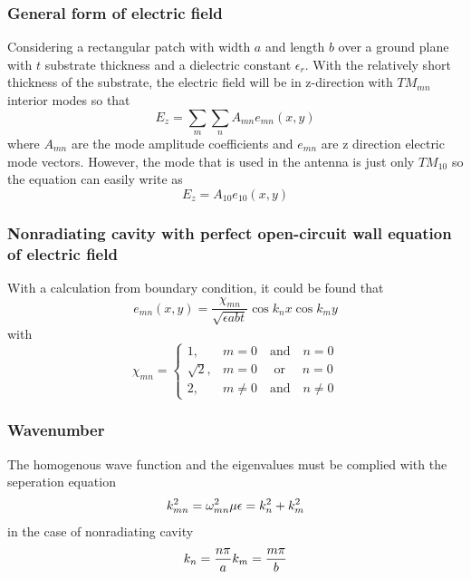 \documentclass[11pt,a4paper]{article}
\begin{document}
      \subsubsection{General form of electric field}
        \indent Considering a rectangular patch with width $a$ and length $b$ over a ground plane with $t$ substrate
                thickness and a dielectric constant $\epsilon_r$. With the relatively short thickness of the substrate,
                the electric field will be in z-direction with $TM_{mn}$ interior modes so that\cite{CaM:81}
        \begin{equation}
          E_z = \sum_m\sum_n A_{mn}e_{mn}(x,y)
        \end{equation}
        \indent where $A_{mn}$ are the mode amplitude coefficients and $e_{mn}$ are z direction electric mode vectors.
        \indent However, the mode that is used in the antenna is just only $TM_{10}$ so the equation can easily write as
        \begin{equation}
           E_z = A_{10}e_{10}(x,y)
        \end{equation}

      \subsubsection{Nonradiating cavity with perfect open-circuit wall equation of electric field}
        \indent With a calculation from boundary condition, it could be found that
          \begin{equation}
            e_{mn}(x,y) = \frac{\chi_{mn}}{\sqrt{\epsilon abt}}\cos{k_nx}\cos{k_my}
          \end{equation}
        \indent with
          \begin{equation}
            \chi_{mn}=
            \begin{cases}
              1       , & m = 0\quad     \text{and}\quad  n = 0 \\
              \sqrt{2}, & m = 0\quad     \text{ or }\quad  n = 0 \\
              2       , & m \neq 0\quad  \text{and}\quad  n \neq 0
            \end{cases}
          \end{equation}

      \subsubsection{Wavenumber}
        \indent The homogenous wave function and the eigenvalues must be complied with the seperation equation
        \begin{equation}
          k_{mn}^2 = \omega_{mn}^2\mu\epsilon = k_n^2 + k_m^2\\
        \end{equation}
        \indent in the case of nonradiating cavity
        \begin{equation}
          k_{n} = \frac{n\pi}{a}\\
          k_{m} = \frac{m\pi}{b}
        \end{equation}
\end{document}
